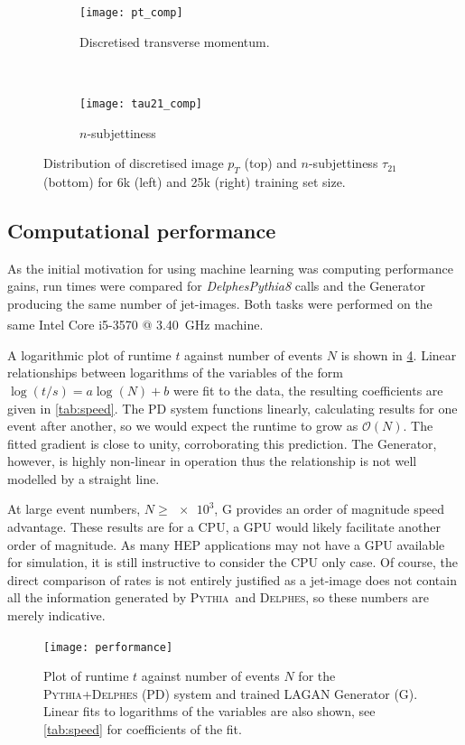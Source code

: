 \documentclass[twocolumn]{article}
\newcommand{\pkg}[1]{\textsc{#1}}
\newcommand{\pythia}{\pkg{Pythia}}
\newcommand{\delphes}{\pkg{Delphes}}
\begin{document}
\begin{figure}[!htbp]
	\centering
	\begin{subfigure}[t]{1.0\linewidth}
	\centering
	\texttt{[image: pt\_comp]}

	\caption{Discretised transverse momentum.}
	\label{fig:pt_comp}
	\end{subfigure}%
	\\
	\begin{subfigure}[t]{1.0\linewidth}
		\centering
		\texttt{[image: tau21\_comp]}
		\caption{$n$-subjettiness}
		\label{fig:tau21_comp}
	\end{subfigure}
	\caption{Distribution of discretised image $p_T$ (top) and $n$-subjettiness $\tau_{21}$ (bottom) for 6k (left) and 25k (right) training set size.}
	\label{fig:phys}
\end{figure}


\subsection{Computational performance}
\label{sec:comp}

As the initial motivation for using machine learning was computing performance gains, run times were compared for \textit{DelphesPythia8} calls and the Generator producing the same number of jet-images. Both tasks were performed on the same Intel\textsuperscript{\textregistered} Core\textsuperscript{\texttrademark} i5-3570 @ \SI{3.40}{\giga\hertz} machine.

A logarithmic plot of runtime $t$ against number of events $N$ is shown in \cref{fig:performance}. Linear relationships between logarithms of the variables of the form $\log(t/s) = a\log(N) + b$ were fit to the data, the resulting coefficients are given in \cref{tab:speed}. The PD system functions linearly, calculating results for one event after another, so we would expect the runtime to grow as $\mathcal{O}(N)$. The fitted gradient is close to unity, corroborating this prediction. The Generator, however, is highly non-linear in operation thus the relationship is not well modelled by a straight line. 

At large event numbers, $N \geq \num{e3}$, G provides an order of magnitude speed advantage. These results are for a CPU, a GPU would likely facilitate another order of magnitude. As many HEP applications may not have a GPU available for simulation, it is still instructive to consider the CPU only case. Of course, the direct comparison of rates is not entirely justified as a jet-image does not contain all the information generated by \pythia~and \delphes, so these numbers are merely indicative.
\begin{figure}[H]
	\centering
	\texttt{[image: performance]}
	
	\caption{Plot of runtime $t$ against number of events $N$ for the \pkg{Pythia}+\pkg{Delphes} (PD) system and trained LAGAN Generator (G). Linear fits to logarithms of the variables are also shown, see \cref{tab:speed} for coefficients of the fit.}
	\label{fig:performance}
	
\end{figure}
\end{document}
